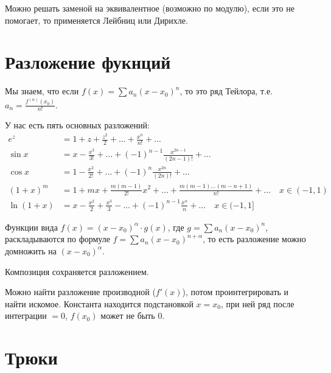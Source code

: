 Можно решать заменой на эквивалентное (возможно по модулю), если это не помогает, то применяется Лейбниц или Дирихле.

\section{Разложение фукнций}

Мы знаем, что если \(f(x) = \sum a_n(x - x_0)^n\), то это ряд Тейлора, т.е. \(a_n = \frac{f^{(n)} (x_0)}{n!} \).

У нас есть пять основных разложений:
\begin{align*}
    e^z        & = 1 + z + \frac{z^2}{2} + \dots + \frac{x^n}{n!} + \dots                                                    \\
    \sin x     & = x - \frac{x^3}{3!} + \dots + ( - 1)^{n - 1} \frac{x^{2n - 1}}{(2n - 1)!} + \dots                          \\
    \cos x     & = 1 - \frac{x^2}{2!} + \dots + ( - 1)^n \frac{x^{2n}}{(2n)!} + \dots                                        \\
    (1 + x)^m  & = 1 + mx + \frac{m(m - 1)}{2!}x^2 + \dots + \frac{m(m - 1)\dots(m - n + 1)}{n!} + \dots \quad x\in( - 1, 1) \\
    \ln(1 + x) & = x - \frac{x^2}{2} + \frac{x^3}{3} - \dots + ( - 1)^{n - 1}\frac{x^n}{n} + \dots \quad x\in( - 1, 1]
\end{align*}

Функции вида \(f(x) = (x - x_0)^\alpha \cdot g(x)\), где \(g = \sum a_n(x - x_0)^n\), раскладываются по формуле \(f = \sum a_n(x - x_0)^{n + \alpha}\), то есть разложение можно домножить на \((x - x_0)^\alpha\).

Композиция сохраняется разложением.

Можно найти разложение производной (\(f'(x)\)), потом проинтегрировать и найти искомое. Константа находится подстановкой \(x = x_0\), при ней ряд после интеграции \( = 0\), \(f(x_0)\) может не быть \(0\).

\section*{Трюки}

